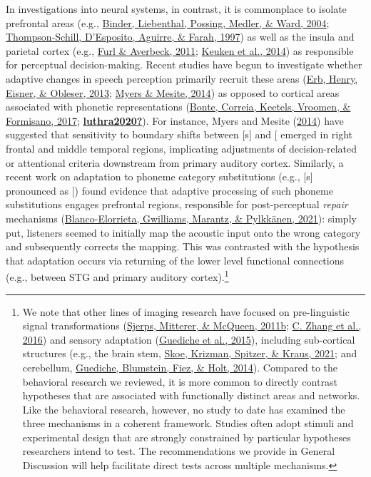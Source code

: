 \documentclass[
  11pt,
  man,floatsintext]{apa6}
\begin{document}
In investigations into neural systems, in contrast, it is commonplace to isolate prefrontal areas (e.g., \protect\hyperlink{ref-binder2004neural}{Binder, Liebenthal, Possing, Medler, \& Ward, 2004}; \protect\hyperlink{ref-thompson1997role}{Thompson-Schill, D'Esposito, Aguirre, \& Farah, 1997}) as well as the insula and parietal cortex (e.g., \protect\hyperlink{ref-furl2011parietal}{Furl \& Averbeck, 2011}; \protect\hyperlink{ref-keuken2014}{Keuken et al., 2014}) as responsible for perceptual decision-making. Recent studies have begun to investigate whether adaptive changes in speech perception primarily recruit these areas (\protect\hyperlink{ref-erb2013brain}{Erb, Henry, Eisner, \& Obleser, 2013}; \protect\hyperlink{ref-myers-mesite2014}{Myers \& Mesite, 2014}) as opposed to cortical areas associated with phonetic representations (\protect\hyperlink{ref-bonte2017}{Bonte, Correia, Keetels, Vroomen, \& Formisano, 2017}; \protect\hyperlink{ref-luthra2020}{\textbf{luthra2020?}}). For instance, Myers and Mesite (\protect\hyperlink{ref-myers-mesite2014}{2014}) have suggested that sensitivity to boundary shifts between {[}s{]} and {[}\ipatext{ʃ}{]} emerged in right frontal and middle temporal regions, implicating adjustments of decision-related or attentional criteria downstream from primary auditory cortex. Similarly, a recent work on adaptation to phoneme category substitutions (e.g., {[}s{]} pronounced as {[}\ipatext{ʃ}{]}) found evidence that adaptive processing of such phoneme substitutions engages prefrontal regions, responsible for post-perceptual \emph{repair} mechanisms (\protect\hyperlink{ref-blanco-elorriera2021}{Blanco-Elorrieta, Gwilliams, Marantz, \& Pylkkänen, 2021}): simply put, listeners seemed to initially map the acoustic input onto the wrong category and subsequently corrects the mapping. This was contrasted with the hypothesis that adaptation occurs via returning of the lower level functional connections (e.g., between STG and primary auditory cortex).\footnote{We note that other lines of imaging research have focused on pre-linguistic signal transformations (\protect\hyperlink{ref-sjerps2011listening}{Sjerps, Mitterer, \& McQueen, 2011b}; \protect\hyperlink{ref-zhang2016functionally}{C. Zhang et al., 2016}) and sensory adaptation (\protect\hyperlink{ref-guediche2015evidence}{Guediche et al., 2015}), including sub-cortical structures (e.g., the brain stem, \protect\hyperlink{ref-skoe2021auditory}{Skoe, Krizman, Spitzer, \& Kraus, 2021}; and cerebellum, \protect\hyperlink{ref-guediche2014}{Guediche, Blumstein, Fiez, \& Holt, 2014}). Compared to the behavioral research we reviewed, it is more common to directly contrast hypotheses that are associated with functionally distinct areas and networks. Like the behavioral research, however, no study to date has examined the three mechanisms in a coherent framework. Studies often adopt stimuli and experimental design that are strongly constrained by particular hypotheses researchers intend to test. The recommendations we provide in General Discussion will help facilitate direct tests across multiple mechanisms.}
\end{document}
